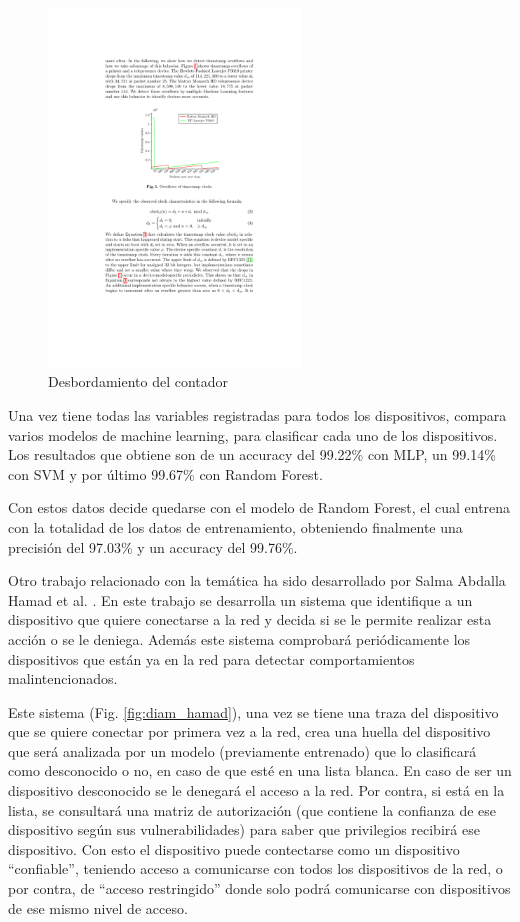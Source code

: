 \begin{figure}
    \centering
    \includegraphics[width=0.6\textwidth]{images/CERN-timestamp_overflow}
    \caption{Desbordamiento del contador \cite{oser2018identifying}}
    \label{fig:cern_ts_overflow}
\end{figure}

Una vez tiene todas las variables registradas para todos los dispositivos, compara varios modelos de machine learning, para clasificar cada uno de los dispositivos. Los resultados que obtiene son de un accuracy del 99.22\% con MLP, un 99.14\% con SVM y por último 99.67\% con Random Forest.

Con estos datos decide quedarse con el modelo de Random Forest, el cual entrena con la totalidad de los datos de entrenamiento, obteniendo finalmente una precisión del 97.03\% y un accuracy del 99.76\%.

Otro trabajo relacionado con la temática ha sido desarrollado por Salma Abdalla Hamad et al. \cite{hamad2019iot}. En este trabajo se desarrolla un sistema que identifique a un dispositivo que quiere conectarse a la red y decida si se le permite realizar esta acción o se le deniega. Además este sistema comprobará periódicamente los dispositivos que están ya en la red para detectar comportamientos malintencionados. 

Este sistema (Fig. \ref{fig:diam_hamad}), una vez se tiene una traza del dispositivo que se quiere conectar por primera vez a la red, crea una huella del dispositivo que será analizada por un modelo (previamente entrenado) que lo clasificará como desconocido o no, en caso de que esté en una lista blanca. En caso de ser un dispositivo desconocido se le denegará el acceso a la red. Por contra, si está en la lista, se consultará una matriz de autorización (que contiene la confianza de ese dispositivo según sus vulnerabilidades) para saber que privilegios recibirá ese dispositivo. Con esto el dispositivo puede contectarse como un dispositivo ``confiable'', teniendo acceso a comunicarse con todos los dispositivos de la red, o por contra, de ``acceso restringido'' donde solo podrá comunicarse con dispositivos de ese mismo nivel de acceso.

